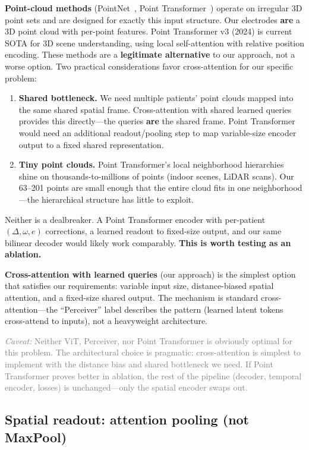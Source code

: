 \documentclass[11pt,letterpaper]{article}
\newcommand{\caveat}[1]{\par\smallskip\noindent\textcolor{gray}{\textit{Caveat:} #1}\smallskip}
\begin{document}
\textbf{Point-cloud methods} (PointNet~\cite{qi2017}, Point Transformer~\cite{zhao2021}) operate on irregular 3D point sets and are designed for exactly this input structure. Our electrodes \textbf{are} a 3D point cloud with per-point features. Point Transformer v3 (2024) is current SOTA for 3D scene understanding, using local self-attention with relative position encoding. These methods are a \textbf{legitimate alternative} to our approach, not a worse option. Two practical considerations favor cross-attention for our specific problem:
\begin{enumerate}[leftmargin=2em]
\item \textbf{Shared bottleneck.} We need multiple patients' point clouds mapped into the same shared spatial frame. Cross-attention with shared learned queries provides this directly---the queries \textbf{are} the shared frame. Point Transformer would need an additional readout/pooling step to map variable-size encoder output to a fixed shared representation.
\item \textbf{Tiny point clouds.} Point Transformer's local neighborhood hierarchies shine on thousands-to-millions of points (indoor scenes, LiDAR scans). Our 63--201 points are small enough that the entire cloud fits in one neighborhood---the hierarchical structure has little to exploit.
\end{enumerate}
Neither is a dealbreaker. A Point Transformer encoder with per-patient $(\Delta, \omega, e)$ corrections, a learned readout to fixed-size output, and our same bilinear decoder would likely work comparably. \textbf{This is worth testing as an ablation.}

\textbf{Cross-attention with learned queries} (our approach) is the simplest option that satisfies our requirements: variable input size, distance-biased spatial attention, and a fixed-size shared output. The mechanism is standard cross-attention---the ``Perceiver'' label describes the pattern (learned latent tokens cross-attend to inputs), not a heavyweight architecture.

\caveat{Neither ViT, Perceiver, nor Point Transformer is obviously optimal for this problem. The architectural choice is pragmatic: cross-attention is simplest to implement with the distance bias and shared bottleneck we need. If Point Transformer proves better in ablation, the rest of the pipeline (decoder, temporal encoder, losses) is unchanged---only the spatial encoder swaps out.}

\subsection{Spatial readout: attention pooling (not MaxPool)}\label{sec:readout}
\end{document}
